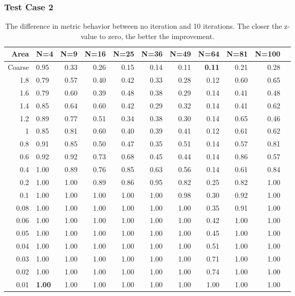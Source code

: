 \documentclass[]{beamer}
\begin{document}
\begin{frame}[t]\frametitle{Test Case 2}
\begin{table}[H]
\centering
\tiny
\caption{The difference in metric behavior between no iteration and 10 iterations. The closer the z-value to zero, the better the improvement.} 
\begin{tabular}{rlrrrrrrrrr}
  \hline
  Area & N=4 & N=9 & N=16 & N=25 & N=36 & N=49 & N=64 & N=81 & N=100 \\ 
  \hline
Coarse & 0.95 & 0.33 & 0.26 & 0.15 & 0.14 & 0.11 & \textbf{\cellcolor{blue!25}0.11} & 0.21 & 0.28 \\ 
  1.8 & 0.79 & 0.57 & 0.40 & 0.42 & 0.33 & 0.28 & 0.12 & 0.60 & 0.65 \\ 
1.6 & 0.79 & 0.60 & 0.39 & 0.48 & 0.38 & 0.29 & 0.14 & 0.41 & 0.48 \\ 
 1.4 & 0.85 & 0.64 & 0.60 & 0.42 & 0.29 & 0.32 & 0.14 & 0.41 & 0.62 \\ 
 1.2 & 0.89 & 0.77 & 0.51 & 0.34 & 0.38 & 0.30 & 0.14 & 0.65 & 0.46 \\ 
 1 & 0.85 & 0.81 & 0.60 & 0.40 & 0.39 & 0.41 & 0.12 & 0.61 & 0.62 \\ 
  0.8 & 0.91 & 0.85 & 0.50 & 0.47 & 0.35 & 0.51 & 0.14 & 0.57 & 0.81 \\ 
 0.6 & 0.92 & 0.92 & 0.73 & 0.68 & 0.45 & 0.44 & 0.14 & 0.86 & 0.57 \\ 
 0.4 & 1.00 & 0.89 & 0.76 & 0.85 & 0.63 & 0.56 & 0.14 & 0.61 & 0.84 \\ 
   0.2 & 1.00 & 1.00 & 0.89 & 0.86 & 0.95 & 0.82 & 0.25 & 0.82 & 1.00 \\ 
   0.1 & 1.00 & 1.00 & 1.00 & 1.00 & 1.00 & 0.98 & 0.30 & 0.92 & 1.00 \\ 
 0.08 & 1.00 & 1.00 & 1.00 & 1.00 & 1.00 & 1.00 & 0.35 & 0.91 & 1.00 \\ 
 0.06 & 1.00 & 1.00 & 1.00 & 1.00 & 1.00 & 1.00 & 0.42 & 1.00 & 1.00 \\ 
   0.05 & 1.00 & 1.00 & 1.00 & 1.00 & 1.00 & 1.00 & 0.45 & 1.00 & 1.00 \\ 
   0.04 & 1.00 & 1.00 & 1.00 & 1.00 & 1.00 & 1.00 & 0.51 & 1.00 & 1.00 \\ 
   0.03 & 1.00 & 1.00 & 1.00 & 1.00 & 1.00 & 1.00 & 0.71 & 1.00 & 1.00 \\ 
   0.02 & 1.00 & 1.00 & 1.00 & 1.00 & 1.00 & 1.00 & 0.74 & 1.00 & 1.00 \\ 
 0.01 & \textbf{\cellcolor{blue!25}1.00} & 1.00 & 1.00 & 1.00 & 1.00 & 1.00 & 1.00 & 1.00 & 1.00 \\ 
   \hline
\end{tabular}
\end{table}
\end{frame}
\end{document}
